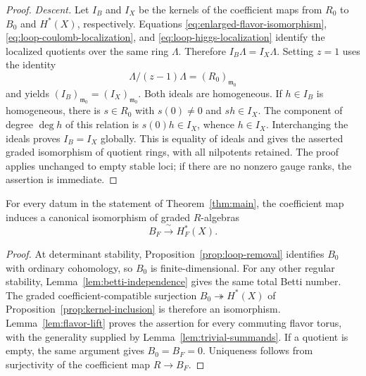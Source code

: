 \begin{proof}
\emph{Descent.}
Let $I_B$ and $I_X$ be the kernels of the coefficient maps from $R_0$ to
$B_0$ and $H^*(X)$, respectively.  Equations
\eqref{eq:enlarged-flavor-isomorphism},
\eqref{eq:loop-coulomb-localization}, and
\eqref{eq:loop-higgs-localization} identify the localized quotients over the
same ring $\Lambda$.  Therefore
$I_B\Lambda=I_X\Lambda$.  Setting $z=1$ uses the identity
\[
 \Lambda/(z-1)\Lambda=(R_0)_{\mathfrak m_0}
\]
and yields
$(I_B)_{\mathfrak m_0}=(I_X)_{\mathfrak m_0}$.
Both ideals are homogeneous.  If $h\in I_B$ is homogeneous, there is
$s\in R_0$ with $s(0)\ne0$ and $sh\in I_X$.  The component of degree
$\deg h$ of this relation is $s(0)h\in I_X$, whence $h\in I_X$.
Interchanging the ideals proves $I_B=I_X$ globally.  This is equality of
ideals and gives the asserted graded isomorphism of quotient rings, with
all nilpotents retained.  The proof applies unchanged to empty stable loci; if there are
no nonzero gauge ranks, the assertion is immediate.
\end{proof}

\begin{theorem}\label{thm:full-torus}
For every datum in the statement of Theorem~\ref{thm:main}, the coefficient
map induces a canonical isomorphism of graded $R$-algebras
\[
 B_F\xrightarrow{\ \sim\ }H_F^*(X).
\]
\end{theorem}

\begin{proof}
At determinant stability, Proposition~\ref{prop:loop-removal} identifies
$B_0$ with ordinary cohomology, so $B_0$ is finite-dimensional.  For any
other regular stability, Lemma~\ref{lem:betti-independence} gives the same
total Betti number.  The graded coefficient-compatible surjection
$B_0\twoheadrightarrow H^*(X)$ of
Proposition~\ref{prop:kernel-inclusion} is therefore an isomorphism.
Lemma~\ref{lem:flavor-lift} proves the assertion for every commuting flavor
torus, with the generality supplied by Lemma~\ref{lem:trivial-summands}.
If a quotient is empty, the same argument gives $B_0=B_F=0$.
Uniqueness follows from surjectivity of the coefficient map $R\to B_F$.
\end{proof}
